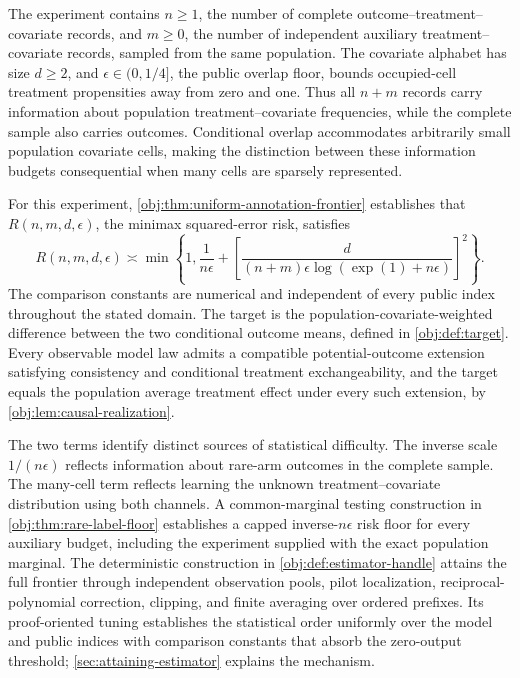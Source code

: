 \documentclass[11pt]{article}
\begin{document}
The experiment contains \(n\ge1\), the number of complete outcome--treatment--covariate records, and \(m\ge0\), the number of independent auxiliary treatment--covariate records, sampled from the same population. The covariate alphabet has size \(d\ge2\), and \(\epsilon\in(0,1/4]\), the public overlap floor, bounds occupied-cell treatment propensities away from zero and one. Thus all \(n+m\) records carry information about population treatment--covariate frequencies, while the complete sample also carries outcomes. Conditional overlap accommodates arbitrarily small population covariate cells, making the distinction between these information budgets consequential when many cells are sparsely represented.

For this experiment, \cref{obj:thm:uniform-annotation-frontier} establishes that \(R(n,m,d,\epsilon)\), the minimax squared-error risk, satisfies
\[
R(n,m,d,\epsilon)
\asymp
\min\left\{
1,\frac{1}{n\epsilon}
+\left[
\frac{d}{(n+m)\epsilon\log(\exp(1)+n\epsilon)}
\right]^2
\right\}.
\]
The comparison constants are numerical and independent of every public index throughout the stated domain. The target is the population-covariate-weighted difference between the two conditional outcome means, defined in \cref{obj:def:target}. Every observable model law admits a compatible potential-outcome extension satisfying consistency and conditional treatment exchangeability, and the target equals the population average treatment effect under every such extension, by \cref{obj:lem:causal-realization}.

The two terms identify distinct sources of statistical difficulty. The inverse scale \(1/(n\epsilon)\) reflects information about rare-arm outcomes in the complete sample. The many-cell term reflects learning the unknown treatment--covariate distribution using both channels. A common-marginal testing construction in \cref{obj:thm:rare-label-floor} establishes a capped inverse-\(n\epsilon\) risk floor for every auxiliary budget, including the experiment supplied with the exact population marginal. The deterministic construction in \cref{obj:def:estimator-handle} attains the full frontier through independent observation pools, pilot localization, reciprocal-polynomial correction, clipping, and finite averaging over ordered prefixes. Its proof-oriented tuning establishes the statistical order uniformly over the model and public indices with comparison constants that absorb the zero-output threshold; \cref{sec:attaining-estimator} explains the mechanism.
\end{document}
